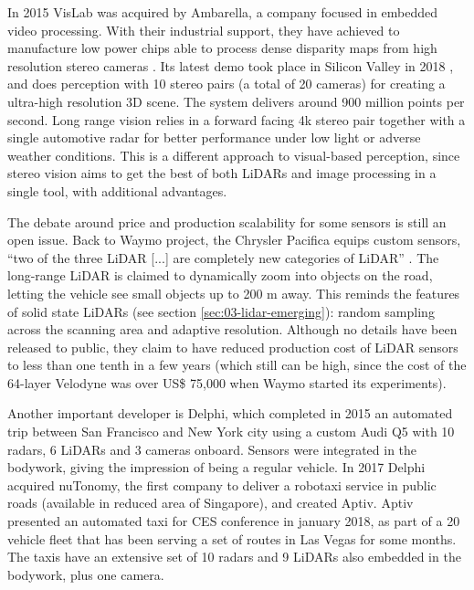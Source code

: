 In 2015 VisLab was acquired by Ambarella, a company focused in embedded video 
processing. With their industrial support, they have achieved to manufacture 
low power chips able to process dense disparity maps from high resolution 
stereo cameras \cite{Ambarella2018}. Its latest demo took place in Silicon 
Valley in 2018 \cite{AUVSI2018}, and does perception with 10 stereo pairs (a 
total of 20 cameras) for creating a ultra-high resolution 3D scene. The system
delivers around 900 million points per second.
Long range vision relies in a forward facing 4k stereo pair together with a 
single automotive radar for better performance under low light or adverse 
weather conditions. This is a different approach to visual-based perception, 
since stereo vision aims to get the best of both LiDARs and image processing in 
a single tool, with additional advantages.

The debate around price and production scalability for some sensors is still an 
open issue. Back to Waymo project, the Chrysler Pacifica equips custom sensors, 
``two of the three LiDAR [...] are completely new categories of LiDAR'' 
\cite{Waymoteam2017}. The long-range LiDAR is claimed to dynamically zoom into 
objects on the road, letting the vehicle see small objects up to 200 m away. 
This reminds the features of solid state LiDARs (see section
 \ref{sec:03-lidar-emerging}): random sampling across the 
scanning area and adaptive resolution. Although no details have been released 
to public, they claim to have reduced production cost of LiDAR sensors to less 
than one tenth in a few years (which still can be high, since the cost of the
64-layer Velodyne was over US\$ 75,000 when Waymo started its experiments).

Another important developer is Delphi, which completed in 2015 an automated
trip between San Francisco and New York city using a custom Audi Q5 with
10 radars, 6 LiDARs and 3 cameras onboard. Sensors were integrated in the
bodywork, giving the impression of being a regular vehicle. In 2017 Delphi
acquired nuTonomy, the first company to deliver a robotaxi service 
in public roads (available in reduced area of Singapore), and created Aptiv. 
Aptiv presented an automated taxi for CES 
conference in january 2018, as part of a 20 vehicle fleet that has been 
serving a set of routes in Las Vegas for some months. The taxis have an
extensive set of 10 radars and 9 LiDARs also embedded in the bodywork, plus
one camera.
